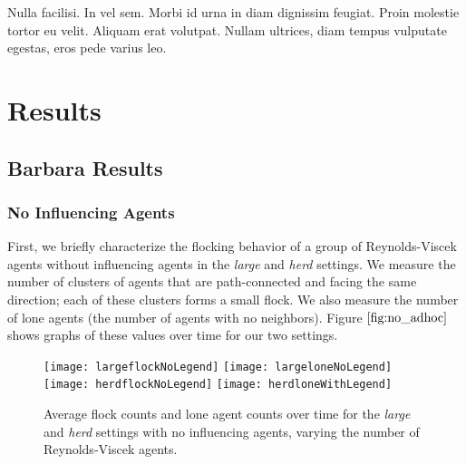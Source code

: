 \begin{savequote}[75mm]
Nulla facilisi. In vel sem. Morbi id urna in diam dignissim feugiat. Proin molestie tortor eu velit. Aliquam erat volutpat. Nullam ultrices, diam tempus vulputate egestas, eros pede varius leo.
\end{savequote}

\chapter{Results}
\label{ch:results}

\section{Barbara Results}
\subsection{No Influencing Agents}
First, we briefly characterize the flocking behavior of a group of Reynolds-Viscek
agents without influencing agents in the \textit{large} and \textit{herd} settings.
We measure the number of clusters of agents that are path-connected and facing the
same direction; each of these clusters forms a small flock.
We also measure the number of lone agents (the number of agents with no neighbors).
Figure $\ref{fig:no_adhoc}$ shows graphs of these values over time for our two
settings.
\begin{figure}
    \centering
    \texttt{[image: largeflockNoLegend]}
    \texttt{[image: largeloneNoLegend]}
    \texttt{[image: herdflockNoLegend]}
    \texttt{[image: herdloneWithLegend]}
    \caption{Average flock counts and lone agent counts over time for the
    \textit{large} and \textit{herd} settings with no influencing agents,
    varying the number of Reynolds-Viscek agents.}
    \label{fig:no_adhoc}
\end{figure}

